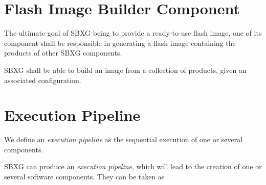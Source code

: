 \documentclass{article}
\begin{document}
\begin{center}
\end{center}

\section{Flash Image Builder Component}

The ultimate goal of SBXG being to provide a ready-to-use flash image, one of
its component shall be responsible in generating a flash image containing the
products of other SBXG components.

\begin{requirement}
  SBXG shall be able to build an image from a collection of products, given an
  associated configuration.
\end{requirement}

\begin{center}
\end{center}


\section{Execution Pipeline}

We define an \emph{execution pipeline} as the sequential execution of one or
several components.

SBXG can produce an \emph{execution pipeline}, which will lead to the creation
of one or several software components. They can be taken as
\end{document}
